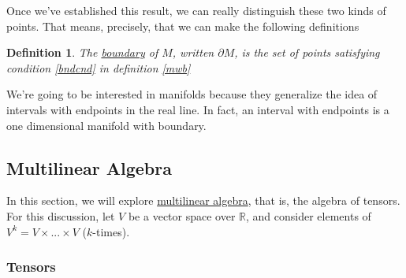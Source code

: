 \documentclass{article}
\newtheorem{definition}{Definition}
\newcommand{\reals}[0]{\mathbb{R}}
\begin{document}
Once we've established this result, we can really distinguish these two kinds of points. That means, precisely, that we can make the following definitions
\begin{definition}
  The \underline{boundary} of \(M\), written \(\partial M\), is the set of points satisfying condition \ref{bndcnd} in definition \ref{mwb}
\end{definition}

We're going to be interested in manifolds because they generalize the idea of intervals with endpoints in the real line. In fact, an interval with endpoints is a one dimensional manifold with boundary.


\subsection{Multilinear Algebra}

In this section, we will explore \underline{multilinear algebra}, that is, the algebra of tensors. For this discussion, let \(V\) be a vector space over \(\reals\), and consider elements of \(V^k = V \times ... \times V\) (\(k\)-times).

\subsubsection{Tensors}
\end{document}
